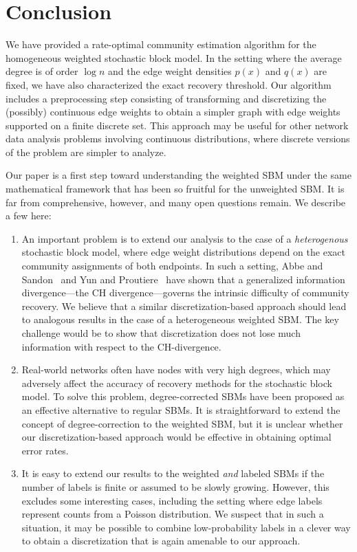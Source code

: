 
\section{Conclusion}
\label{sec:conclusion}

We have provided a rate-optimal community estimation algorithm for the homogeneous weighted stochastic block model. In the setting where the average degree is of order $\log n$ and the edge weight densities $p(x)$ and $q(x)$ are fixed, we have also characterized the exact recovery threshold. Our algorithm includes a preprocessing step consisting of transforming and discretizing the (possibly) continuous edge weights to obtain a simpler graph with edge weights supported on a finite discrete set. This approach may be useful for other network data analysis problems involving continuous distributions, where discrete versions of the problem are simpler to analyze.

Our paper is a first step toward understanding the weighted SBM under the same mathematical framework that has been so fruitful for the unweighted SBM. It is far from comprehensive, however, and many open questions remain. We describe a few here:
\begin{enumerate}
\item An important problem is to extend our analysis to the case of a \emph{heterogenous} stochastic block model, where edge weight distributions depend on the exact community assignments of both endpoints. In such a setting, Abbe and Sandon~\cite{AbbSan15} and Yun and Proutiere~\cite{yun2016optimal} have shown that a generalized information divergence---the CH divergence---governs the intrinsic difficulty of community recovery. We believe that a similar discretization-based approach should lead to analogous results in the case of a heterogeneous weighted SBM. The key challenge would be to show that discretization does not lose much information with respect to the CH-divergence.
\item Real-world networks often have nodes with very high degrees, which may adversely affect the accuracy of recovery methods for the stochastic block model. To solve this problem, degree-corrected SBMs \cite{zhao2012consistency, gao2016community} have been proposed as an effective alternative to regular SBMs. It is straightforward to extend the concept of degree-correction to the weighted SBM, but it is unclear whether our discretization-based approach would be effective in obtaining optimal error rates.
\item It is easy to extend our results to the weighted \emph{and} labeled SBMs if the number of labels is finite or assumed to be slowly growing. However, this excludes some interesting cases, including the setting where edge labels represent counts  from a Poisson distribution. We suspect that in such a situation, it may be possible to combine low-probability labels in a clever way to obtain a discretization that is again amenable to our approach. 
\end{enumerate}

